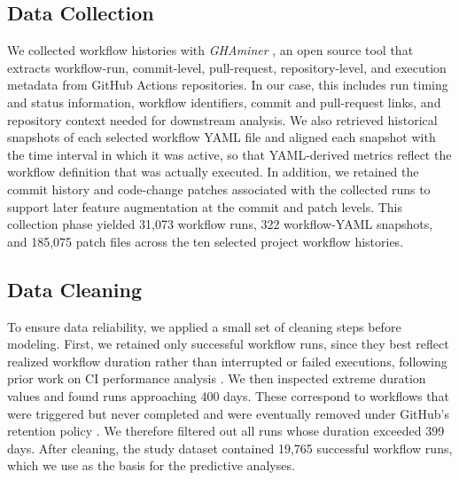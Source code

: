 \documentclass[conference]{IEEEconf}
\begin{document}
\subsection{Data Collection}
We collected workflow histories with \textit{GHAminer} \cite{ghaminer}, an open source tool that extracts workflow-run, commit-level, pull-request, repository-level, and execution metadata from GitHub Actions repositories. In our case, this includes run timing and status information, workflow identifiers, commit and pull-request links, and repository context needed for downstream analysis. We also retrieved historical snapshots of each selected workflow YAML file and aligned each snapshot with the time interval in which it was active, so that YAML-derived metrics reflect the workflow definition that was actually executed. In addition, we retained the commit history and code-change patches associated with the collected runs to support later feature augmentation at the commit and patch levels. This collection phase yielded 31,073 workflow runs, 322 workflow-YAML snapshots, and 185,075 patch files across the ten selected project workflow histories.


\subsection{Data Cleaning}
To ensure data reliability, we applied a small set of cleaning steps before modeling. First, we retained only successful workflow runs, since they best reflect realized workflow duration rather than interrupted or failed executions, following prior work on CI performance analysis \cite{ghaleb2019longbuild,Wu2022DockerBuildDuration}. We then inspected extreme duration values and found runs approaching 400 days. These correspond to workflows that were triggered but never completed and were eventually removed under GitHub's retention policy \cite{githubretentiondocs}. We therefore filtered out all runs whose duration exceeded 399 days. After cleaning, the study dataset contained 19,765 successful workflow runs, which we use as the basis for the predictive analyses.
\end{document}
